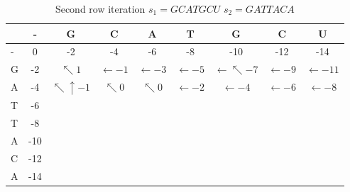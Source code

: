 \documentclass[11pt]{article}
\begin{document}
\begin{table}[ht!]
	\caption{Second row iteration $s_1 = GCATGCU$ $s_2 = GATTACA$}
	\label{tab:sndrow_NW}
	\centering

	\begin{tabular}{l|c ccccccc}
	\hline

	\hline
		  & - & G & C & A & T & G & C & U \\
	\hline
	 	- & 0  & -2& -4& -6& -8&-10&-12&-14\\
	 	G & -2 &$\nwarrow 1$ & $\leftarrow -1$ & $\leftarrow -3$ & $\leftarrow -5$ &  $\leftarrow \nwarrow -7$ & $\leftarrow -9$ & $\leftarrow -11$ \\

	 	A & -4 & $ \nwarrow \uparrow -1$ &  $\nwarrow 0$ & $\nwarrow 0$ & $\leftarrow -2$ & $\leftarrow -4$ & $\leftarrow -6$ & $\leftarrow -8$ \\

	 	T & -6 &   &   &   &   &   &   &   \\
	 	T & -8 &   &   &   &   &   &   &   \\
	 	A & -10&   &   &   &   &   &   &   \\
	 	C & -12&   &   &   &   &   &   &   \\
	 	A & -14&   &   &   &   &   &   &   \\
	

	\hline
	\end{tabular}
\end{table}































\newpage
\end{document}
